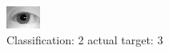 \begin{figure}[h!]
\begin{center}
\includegraphics[width=0.60\columnwidth]{figures/ID1145_class_2_target_3.png}
\end{center}
\caption{ Classification: 2 actual target: 3}
\label{fig:ID1145_class_2_target_3}
\end{figure}
